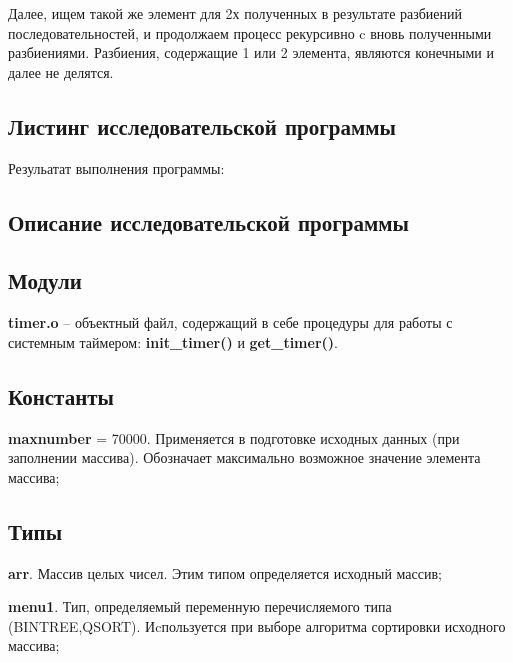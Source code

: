 \documentclass[a4paper,11pt]{article}
\begin{document}
Далее, ищем такой же элемент для 2х полученных в результате разбиений последователь\-ностей, и продолжаем
процесс рекурсивно c вновь полученными разбиениями. Разбиения, содержащие 1 или 2 элемента, являются конечными и далее не делятся.
\\


\begin{center}
\section{Листинг исследовательской программы}
\end{center}
\scriptsize

\normalsize

Резульатат выполнения программы:
 \scriptsize
 
 \normalsize
 

\begin{center}
\section{Описание исследовательской программы}
\end{center}
\begin{center}
\subsection{Модули}
\end{center}

{\bf timer.o} -- объектный файл, содержащий в себе процедуры для работы с системным таймером: {\bf init\_timer()} и {\bf get\_timer()}.  
\begin{center}
\subsection{Константы}
\end{center}
{\bf maxnumber} = 70000.  Применяется в подготовке исходных данных (при заполнении массива). Обозначает максимально возможное значение элемента массива;
\linebreak 
\begin{center}
\subsection{Типы}
\end{center}

{\bf arr}. Массив целых чисел. Этим типом определяется исходный массив;

\linebreak 
{\bf menu1}. Тип, определяемый переменную перечисляемого типа (BINTREE,QSORT). Иcпользуется
при выборе алгоритма сортировки исходного массива;
\end{document}
